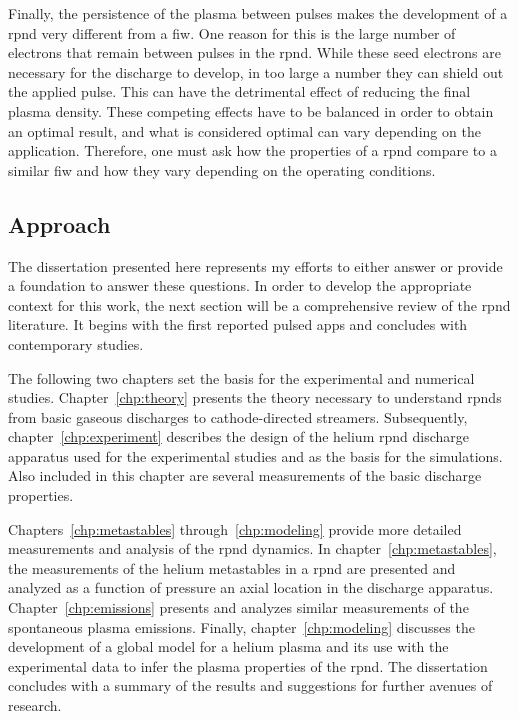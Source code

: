 Finally, the persistence of the plasma between pulses makes the development of a
\acs{rpnd} very different from a \acs{fiw}. One reason for this is the large
number of electrons that remain between pulses in the \acs{rpnd}. While these
seed electrons are necessary for the discharge to develop, in too large a number
they can shield out the applied pulse. This can have the detrimental effect of
reducing the final plasma density. These competing effects have to be balanced
in order to obtain an optimal result, and what is considered optimal can vary
depending on the application. Therefore, one must ask how the properties of a
\acs{rpnd} compare to a similar \acs{fiw} and how they vary depending on the
operating conditions.

\subsection{Approach}

The dissertation presented here represents my efforts to either answer or
provide a foundation to answer these questions. In order to develop the
appropriate context for this work, the next section will be a comprehensive
review of the \acs{rpnd} literature. It begins with the first reported pulsed
\acs{app}s and concludes with contemporary studies.

The following two chapters set the basis for the experimental and numerical
studies. Chapter~\ref{chp:theory} presents the theory necessary to understand
\acs{rpnd}s from basic gaseous discharges to cathode-directed streamers.
Subsequently, chapter~\ref{chp:experiment} describes the design of the helium
\acs{rpnd} discharge apparatus used for the experimental studies and as the
basis for the simulations. Also included in this chapter are several
measurements of the basic discharge properties.

Chapters~\ref{chp:metastables} through~\ref{chp:modeling} provide more detailed
measurements and analysis of the \acs{rpnd} dynamics. In
chapter~\ref{chp:metastables}, the measurements of the helium metastables in a
\acs{rpnd} are presented and analyzed as a function of pressure an axial
location in the discharge apparatus. Chapter~\ref{chp:emissions} presents and
analyzes similar measurements of the spontaneous plasma emissions. Finally,
chapter~\ref{chp:modeling} discusses the development of a global model for a
helium plasma and its use with the experimental data to infer the plasma
properties of the \acs{rpnd}. The dissertation concludes with a summary of the
results and suggestions for further avenues of research.

